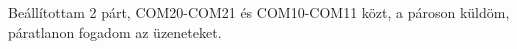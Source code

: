 \documentclass[12pt]{article}
\begin{document}
\begin{itemize}
\begin{figure}[H]
	\centering
	\caption{}
	\label{fig:comnull}
\end{figure}

Beállítottam 2 párt, COM20-COM21 és COM10-COM11 közt, a pároson küldöm, páratlanon fogadom az üzeneteket. 

\begin{figure}[H]
	\centering
	\caption{}
	\label{fig:sorossend}
\end{figure}


\end{itemize}
\end{document}
